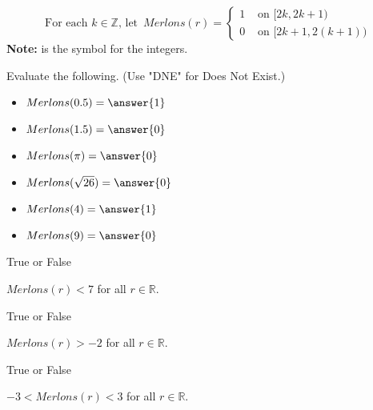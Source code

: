 \documentclass{ximera}
\author{Lee Wayand}
\begin{document}
\[
\text{For each } k \in \mathbb{Z} \text{, let } \, Merlons(r) = 
\begin{cases}
  1 & \text{ on } [2k, 2k+1) \\
  0 & \text{ on } [2k+1,2(k+1)) 
\end{cases}
\]
\textbf{Note: }  is the symbol for the integers. \\







\begin{exercise}

Evaluate the following. (Use "DNE" for Does Not Exist.)


\begin{itemize}
\item $Merlons(0.5) = \answer{1}$  
\item $Merlons(1.5) = \answer{0}$  
\item $Merlons(\pi) = \answer{0}$  
\item $Merlons(\sqrt{26}) = \answer{0}$  
\item $Merlons(4) = \answer{1}$  
\item $Merlons(9) = \answer{0}$  
\end{itemize}

\end{exercise}












\begin{exercise} True or False


$Merlons(r) < 7$ for all $r \in \mathbb{R}$.

\begin{multipleChoice}
\end{multipleChoice}

\end{exercise}











\begin{exercise} True or False


$Merlons(r) > -2$ for all $r \in \mathbb{R}$.

\begin{multipleChoice}
\end{multipleChoice}

\end{exercise}











\begin{exercise} True or False


$-3 < Merlons(r) < 3$ for all $r \in \mathbb{R}$.

\begin{multipleChoice}
\end{multipleChoice}

\end{exercise}
\end{document}
